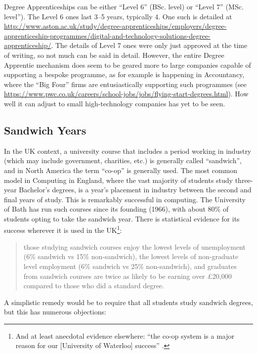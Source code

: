 \documentclass[sigconf,anonymous]{acmart}
\begin{document}
Degree Apprenticeships can be either ``Level 6'' (BSc. level) or
``Level 7'' (MSc. level''). The Level 6 ones last 3--5 years,
typically 4. One such is detailed at
\url{http://www.aston.ac.uk/study/degree-apprenticeships/employers/degree-apprenticeship-programmes/digital-and-technology-solutions-degree-apprenticeship/}. The
details of Level 7 ones \cite{IfA2018a} were only just approved at the
time of writing, so not much can be said in detail. However, the
entire Degree Apprentie mechanism does seem to be geared more to large
companies capable of supporting a bespoke programme, as for example is
happening in Accountancy, where the ``Big Four'' firms are
entusiastically supporting such programmes (see
\url{https://www.pwc.co.uk/careers/school-jobs/jobs/flying-start-degrees.html}). How
well it can adjust to small high-technology companies has yet to be
seen.

\subsection{Sandwich Years}

In the UK context, a university course that includes a period
working in industry (which may include government, charities, etc.) is
generally called ``sandwich'', and in North America the term ``co-op''
is generally used. The most common model in Computing in England,
where the vast majority of students study three-year Bachelor's
degrees, is a year's placement in industry between the second and
final years of study. This is remarkably successful in computing. The
University of Bath has run such courses since its founding (1966),
with about 80\% of students opting to take the sandwich year. There is
statistical evidence for its success wherever it is used in the
UK\footnote{And at least anecdotal evidence elsewhere: ``the co-op
system is a major reason for our [University of Waterloo] success''
\cite{Watt2017a}.}:

\begin{quote} those studying sandwich courses enjoy the lowest levels
of unemployment (6\% sandwich vs 15\% non-sandwich), the lowest levels
of non-graduate level employment (6\% sandwich vs 25\% non-sandwich),
and graduates from sandwich courses are twice as likely to be earning
over \pounds20,000 compared to those who did a standard
degree. \cite[\P2.5]{Shadbolt2016a}
\end{quote}

A simplistic remedy would be to require that all students study
sandwich degrees, but this has numerous objections:
\end{document}
